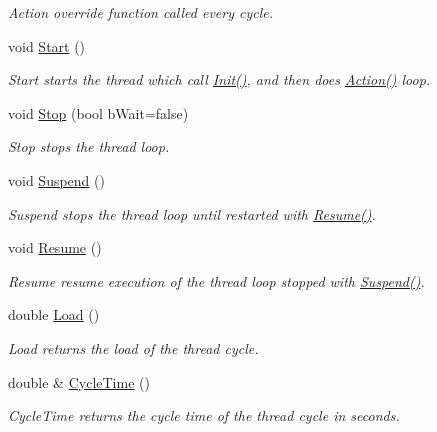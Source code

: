 \begin{DoxyCompactItemize}
\begin{DoxyCompactList}\small\item\em Action override function called every cycle. \end{DoxyCompactList}\item 
void \hyperlink{classRCS_1_1Thread_a86b50ec69dd0baeda270b115d72c1c15}{Start} ()
\begin{DoxyCompactList}\small\item\em Start starts the thread which call \hyperlink{classRCS_1_1Thread_a53ee19c04d064c9a23f0909cf9a4b2cc}{Init()}, and then does \hyperlink{classRCS_1_1Thread_a327655d2626c51ea61bcc233a94dc78e}{Action()} loop. \end{DoxyCompactList}\item 
void \hyperlink{classRCS_1_1Thread_ae0c4a68567ab695f4b7daf755ab874d6}{Stop} (bool b\-Wait=false)
\begin{DoxyCompactList}\small\item\em Stop stops the thread loop. \end{DoxyCompactList}\item 
void \hyperlink{classRCS_1_1Thread_a6a5f86951a6b1fa10bc90844366bd23e}{Suspend} ()
\begin{DoxyCompactList}\small\item\em Suspend stops the thread loop until restarted with \hyperlink{classRCS_1_1Thread_adf2b3b0fc8b643b1fd2b6f28f30c7a2e}{Resume()}. \end{DoxyCompactList}\item 
void \hyperlink{classRCS_1_1Thread_adf2b3b0fc8b643b1fd2b6f28f30c7a2e}{Resume} ()
\begin{DoxyCompactList}\small\item\em Resume resume execution of the thread loop stopped with \hyperlink{classRCS_1_1Thread_a6a5f86951a6b1fa10bc90844366bd23e}{Suspend()}. \end{DoxyCompactList}\item 
double \hyperlink{classRCS_1_1Thread_a0de02ea91ce412d0770452dcd2256e35}{Load} ()
\begin{DoxyCompactList}\small\item\em Load returns the load of the thread cycle. \end{DoxyCompactList}\item 
double \& \hyperlink{classRCS_1_1Thread_a1738e943d3ca8a9861941610db819161}{Cycle\-Time} ()
\begin{DoxyCompactList}\small\item\em Cycle\-Time returns the cycle time of the thread cycle in seconds. \end{DoxyCompactList}\item 

\end{DoxyCompactItemize}
